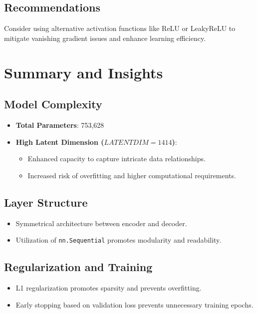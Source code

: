\documentclass[10pt]{article}
\begin{document}
\subsection{Recommendations}
Consider using alternative activation functions like ReLU or LeakyReLU to mitigate vanishing gradient issues and enhance learning efficiency.

\section{Summary and Insights}

\subsection{Model Complexity}
\begin{itemize}
    \item \textbf{Total Parameters}: 753,628
    \item \textbf{High Latent Dimension (\( LATENTDIM = 1414 \))}:
    \begin{itemize}
        \item Enhanced capacity to capture intricate data relationships.
        \item Increased risk of overfitting and higher computational requirements.
    \end{itemize}
\end{itemize}

\subsection{Layer Structure}
\begin{itemize}
    \item Symmetrical architecture between encoder and decoder.
    \item Utilization of \texttt{nn.Sequential} promotes modularity and readability.
\end{itemize}

\subsection{Regularization and Training}
\begin{itemize}
    \item L1 regularization promotes sparsity and prevents overfitting.
    \item Early stopping based on validation loss prevents unnecessary training epochs.
\end{itemize}
\end{document}
